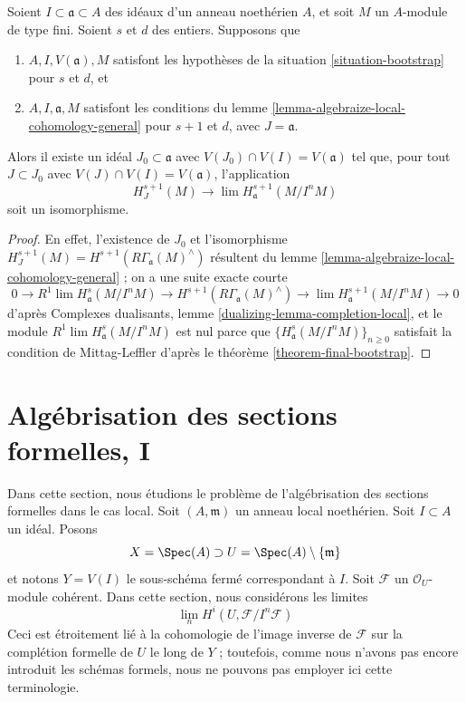\begin{lemma}
\label{lemma-combine-two}
Soient $I \subset \mathfrak a \subset A$ des idéaux d'un anneau noethérien $A$,
et soit $M$ un $A$-module de type fini. Soient $s$ et $d$ des entiers.
Supposons que
\begin{enumerate}
\item $A, I, V(\mathfrak a), M$ satisfont les hypothèses de la
situation \ref{situation-bootstrap} pour $s$ et $d$, et
\item $A, I, \mathfrak a, M$ satisfont les conditions du
lemme \ref{lemma-algebraize-local-cohomology-general}
pour $s + 1$ et $d$, avec $J = \mathfrak a$.
\end{enumerate}
Alors il existe un idéal
$J_0 \subset \mathfrak a$ avec $V(J_0) \cap V(I) = V(\mathfrak a)$
tel que, pour tout $J \subset J_0$ avec $V(J) \cap V(I) = V(\mathfrak a)$,
l'application
$$
H^{s + 1}_J(M) \longrightarrow \lim H^{s + 1}_\mathfrak a(M/I^nM)
$$
soit un isomorphisme.
\end{lemma}

\begin{proof}
En effet, l'existence de $J_0$
et l'isomorphisme
$H^{s + 1}_J(M) = H^{s + 1}(R\Gamma_\mathfrak a(M)^\wedge)$
résultent du lemme \ref{lemma-algebraize-local-cohomology-general} ;
on a une suite exacte courte
$$
0 \to R^1\lim H^s_\mathfrak a(M/I^nM) \to
H^{s + 1}(R\Gamma_\mathfrak a(M)^\wedge) \to
\lim H^{s + 1}_\mathfrak a(M/I^nM) \to 0
$$
d'après Complexes dualisants, lemme \ref{dualizing-lemma-completion-local},
et le module $R^1\lim H^s_\mathfrak a(M/I^nM)$ est nul parce que
$\{H^s_\mathfrak a(M/I^nM)\}_{n \geq 0}$ satisfait la condition de Mittag-Leffler
d'après le théorème \ref{theorem-final-bootstrap}.
\end{proof}








\section{Algébrisation des sections formelles, I}
\label{section-algebraization-sections}

\noindent
Dans cette section, nous étudions le problème de l'algébrisation des
sections formelles dans le cas local.
Soit $(A, \mathfrak m)$ un anneau local noethérien.
Soit $I \subset A$ un idéal. Posons
$$
X = \Spec(A) \supset U = \Spec(A) \setminus \{\mathfrak m\}
$$
et notons $Y = V(I)$ le sous-schéma fermé correspondant à $I$.
Soit $\mathcal{F}$ un $\mathcal{O}_U$-module cohérent.
Dans cette section, nous considérons les limites
$$
\lim_n H^i(U, \mathcal{F}/I^n\mathcal{F})
$$
Ceci est étroitement lié à la cohomologie de l'image inverse
de $\mathcal{F}$ sur la complétion formelle de $U$ le long de $Y$ ;
toutefois, comme nous n'avons pas encore introduit les schémas formels,
nous ne pouvons pas employer ici cette terminologie.

